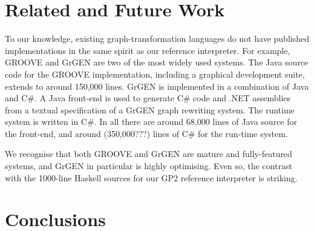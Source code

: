 \section{Related and Future Work}
\label{sec:relatedandfuture}

To our knowledge, existing graph-transformation languages do not have published implementations
in the same spirit as our reference interpreter.
For example, GROOVE\cite{Ghamarianetal12} and GrGEN\cite{JakumeitBuchwaldKroll2010}
are two of the most widely used systems.
The Java source code for the GROOVE implementation, including a graphical development suite,
extends to around 150,000 lines.
GrGEN is implemented in a combination of Java and C\#.
A Java front-end is used to generate C\# code and
.NET assemblies from a textual specification of a GrGEN graph rewriting system. The runtime system is written in C\#. 
In all there are around 68,000 lines of Java source for the front-end,
and around (350,000???) lines of C\# for the run-time system.

We recognise that both GROOVE and GrGEN are mature and fully-featured systems,
and GrGEN in particular is highly optimising.
Even so, the contrast with the 1000-line Haskell sources for our GP2 reference interpreter
is striking.

\section{Conclusions}
\label{sec:conclusions}






